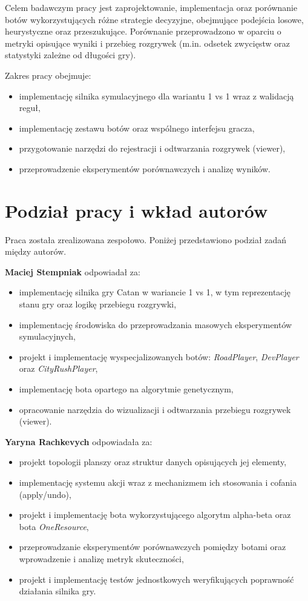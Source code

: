 \documentclass[polish,inz,longabstract]{iithesis}
\begin{document}
Celem badawczym pracy jest zaprojektowanie, implementacja oraz porównanie botów wykorzystujących różne strategie decyzyjne, obejmujące podejścia losowe, heurystyczne oraz przeszukujące. Porównanie przeprowadzono w oparciu o metryki opisujące wyniki i przebieg rozgrywek (m.in. odsetek zwycięstw oraz statystyki zależne od długości gry).

Zakres pracy obejmuje:
\begin{itemize}
\item implementację silnika symulacyjnego dla wariantu 1 vs 1 wraz z walidacją reguł,
\item implementację zestawu botów oraz wspólnego interfejsu gracza,
\item przygotowanie narzędzi do rejestracji i odtwarzania rozgrywek (viewer),
\item przeprowadzenie eksperymentów porównawczych i analizę wyników.
\end{itemize}

\section{Podział pracy i wkład autorów}

Praca została zrealizowana zespołowo. Poniżej przedstawiono podział zadań między autorów.

\textbf{Maciej Stempniak} odpowiadał za:
\begin{itemize}
\item implementację silnika gry Catan w wariancie 1 vs 1, w tym reprezentację stanu gry oraz logikę przebiegu rozgrywki,
\item implementację środowiska do przeprowadzania masowych eksperymentów symulacyjnych,
\item projekt i implementację wyspecjalizowanych botów: \textit{RoadPlayer}, \textit{DevPlayer} oraz \textit{CityRushPlayer},
\item implementację bota opartego na algorytmie genetycznym,
\item opracowanie narzędzia do wizualizacji i odtwarzania przebiegu rozgrywek (viewer).
\end{itemize}

\textbf{Yaryna Rachkevych} odpowiadała za:
\begin{itemize}
\item projekt topologii planszy oraz struktur danych opisujących jej elementy,
\item implementację systemu akcji wraz z mechanizmem ich stosowania i cofania (apply/undo),
\item projekt i implementację bota wykorzystującego algorytm alpha-beta oraz bota \textit{OneResource},
\item przeprowadzanie eksperymentów porównawczych pomiędzy botami oraz wprowadzenie i analizę metryk skuteczności,
\item projekt i implementację testów jednostkowych weryfikujących poprawność działania silnika gry.
\end{itemize}
\end{document}
